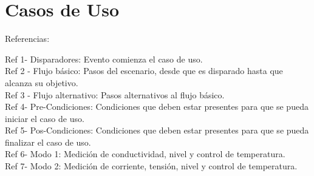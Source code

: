 
\chapter{Casos de Uso} %

\label{AppendixA} %

Referencias:

Ref 1-  Disparadores:  Evento comienza el caso de uso.\\
Ref 2 - Flujo básico:  Pasos del escenario, desde que es disparado hasta que alcanza su objetivo.\\
Ref 3 - Flujo alternativo:  Pasos alternativos al flujo básico. \\
Ref 4-  Pre-Condiciones:  Condiciones que deben estar presentes para que se pueda iniciar el caso de uso.\\
Ref 5-  Pos-Condiciones: Condiciones que deben estar presentes para que se pueda finalizar el caso de uso.\\
Ref 6-  Modo 1: Medición de conductividad, nivel y control de temperatura.\\
Ref 7-  Modo 2: Medición de corriente, tensión, nivel y control de temperatura.\\

